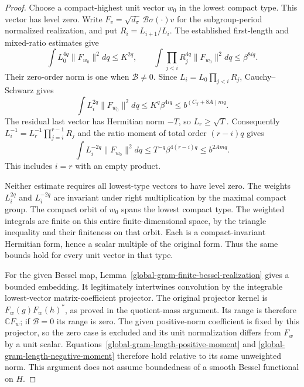 \begin{proof}
Choose a compact-highest unit vector $w_0$ in the lowest compact
type.  This vector has level zero.  Write
$F_v=\sqrt{d_\sigma}\,\mathcal B\sigma(\cdot)v$ for the
subgroup-period normalized realization, and put
$R_i=L_{i+1}/L_i$.  The established first-length and mixed-ratio
estimates give
\[
 \int L_0^{4q}\|F_{w_0}\|^2dq\le K^{2q},\qquad
 \int\prod_{j<i}R_j^{4q}\|F_{w_0}\|^2dq
                                  \le\beta^{8iq}.
\]
Their zero-order norm is one when $\mathcal B\ne0$.
Since $L_i=L_0\prod_{j<i}R_j$, Cauchy--Schwarz gives
\begin{equation}\label{global-gram-length-positive-moment}
 \int L_i^{2q}\|F_{w_0}\|^2dq
                  \le K^q\beta^{4iq}
                  \le b^{(C_T+8A)mq}.
\end{equation}
The residual last vector has Hermitian norm $-T$, so
$L_r\ge\sqrt T$.  Consequently
$L_i^{-1}=L_r^{-1}\prod_{j=i}^{r-1}R_j$ and the ratio
moment of total order $(r-i)q$ gives
\begin{equation}\label{global-gram-length-negative-moment}
 \int L_i^{-2q}\|F_{w_0}\|^2dq
       \le T^{-q}\beta^{4(r-i)q}\le b^{2Amq}.
\end{equation}
This includes $i=r$ with an empty product.

Neither estimate requires all lowest-type vectors to have level
zero.  The weights $L_i^{2q}$ and $L_i^{-2q}$ are invariant
under right multiplication by the maximal compact group.
The compact orbit of $w_0$ spans the lowest compact type.
The weighted integrals are finite on this entire finite-dimensional
space, by the triangle inequality and their finiteness on that
orbit.  Each is a compact-invariant Hermitian form, hence a
scalar multiple of the original form.  Thus the same bounds
hold for every unit vector in that type.

For the given Bessel map, Lemma~\ref{global-gram-finite-bessel-realization}
gives a bounded embedding.  It legitimately intertwines convolution
by the integrable lowest-vector matrix-coefficient projector.
The original projector kernel is
$F_w(g)F_w(h)^*$, as proved in the quotient-mass argument.
Its range is therefore $\mathbb C F_w$; if $\mathcal B=0$
its range is zero.  The given positive-norm coefficient is fixed
by this projector, so the zero case is excluded and its unit
normalization differs from $F_w$ by a unit scalar.
Equations~\eqref{global-gram-length-positive-moment} and
\eqref{global-gram-length-negative-moment} therefore hold relative
to its same unweighted norm.  This argument does not assume
boundedness of a smooth Bessel functional on $H$.


\end{proof}
